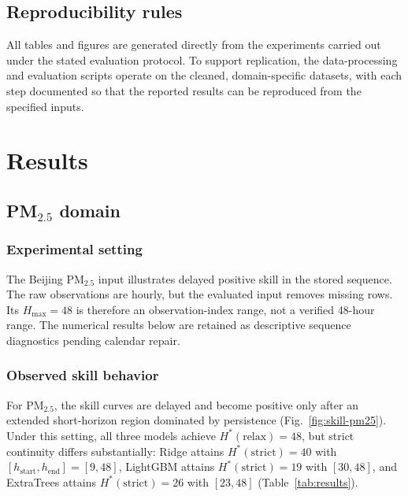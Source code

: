 \documentclass[pdflatex,sn-mathphys]{sn-jnl}
\begin{document}
\subsection{Reproducibility rules}
All tables and figures are generated directly from the experiments
carried out under the stated evaluation protocol. To support
replication, the data-processing and evaluation scripts operate on the
cleaned, domain-specific datasets, with each step documented so that
the reported results can be reproduced from the specified inputs.

\section{Results}\label{sec:results}

\subsection{\texorpdfstring{PM$_{2.5}$}{PM2.5} domain}\label{sec:pm25}

\subsubsection{Experimental setting}
The Beijing PM$_{2.5}$ input \citep{chen2015beijingpm25} illustrates delayed
positive skill in the stored sequence. The raw observations are hourly, but
the evaluated input removes missing rows. Its $H_{\max}=48$ is therefore an
observation-index range, not a verified 48-hour range. The numerical results
below are retained as descriptive sequence diagnostics pending calendar repair.

\subsubsection{Observed skill behavior}
For PM$_{2.5}$, the skill curves are delayed and become positive only after an extended short-horizon region dominated by persistence (Fig.~\ref{fig:skill-pm25}). Under this setting, all three models achieve $H^*(\mathrm{relax})=48$, but strict continuity differs substantially: Ridge attains $H^*(\mathrm{strict})=40$ with $[h_{\mathrm{start}},h_{\mathrm{end}}]=[9,48]$, LightGBM attains $H^*(\mathrm{strict})=19$ with $[30,48]$, and ExtraTrees attains $H^*(\mathrm{strict})=26$ with $[23,48]$ (Table~\ref{tab:results}).
\end{document}
